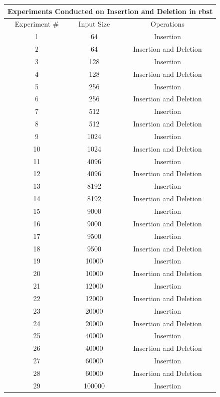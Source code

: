\documentclass[12pt, a4paper]{article}
\begin{document}
 \begin{table}[H]
    \begin{tabular}{|c|c|c|}
      \hline
      \multicolumn{3}{|c|}{Experiments Conducted on Insertion and Deletion in \acrshort{rbst}}\\
      \hline
      Experiment \# & Input Size & Operations \\
      \hline
      1 & 64 & Insertion \\
      2 & 64 & Insertion and Deletion \\
      3 & 128 & Insertion \\
      4 & 128 & Insertion and Deletion \\
      5 & 256 & Insertion \\
      6 & 256 & Insertion and Deletion \\
      7 & 512 & Insertion \\
      8 & 512 & Insertion and Deletion \\
      9 & 1024 & Insertion \\
      10 & 1024 & Insertion and Deletion \\
      11 & 4096 & Insertion \\
      12 & 4096 & Insertion and Deletion \\
      13 & 8192 & Insertion \\
      14 & 8192 & Insertion and Deletion \\
      15 & 9000 & Insertion \\
      16 & 9000 & Insertion and Deletion \\
      17 & 9500 & Insertion \\
      18 & 9500 & Insertion and Deletion \\
      19 & 10000 & Insertion \\
      20 & 10000 & Insertion and Deletion \\
      21 & 12000 & Insertion \\
      22 & 12000 & Insertion and Deletion \\
      23 & 20000 & Insertion \\
      24 & 20000 & Insertion and Deletion \\
      25 & 40000 & Insertion \\
      26 & 40000 & Insertion and Deletion \\
      27 & 60000 & Insertion \\
      28 & 60000 & Insertion and Deletion \\
      29 & 100000 & Insertion \\

\end{tabular}
\end{table}
\end{document}
